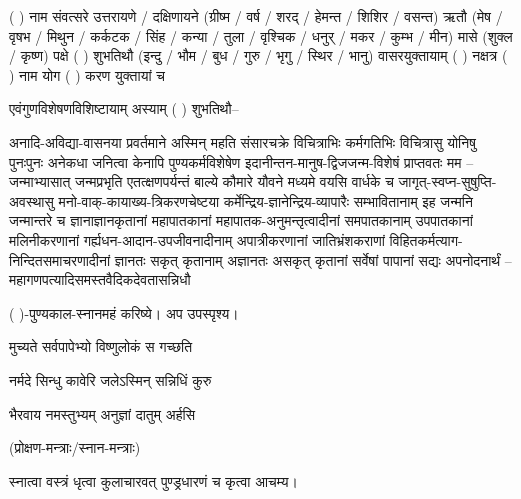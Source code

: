 (   ) नाम संवत्सरे उत्तरायणे / दक्षिणायने 
(ग्रीष्म / वर्ष / शरद् / हेमन्त / शिशिर / वसन्त) ऋतौ  (मेष / वृषभ / मिथुन / कर्कटक / सिंह / कन्या / तुला / 
वृश्चिक / धनुर् / मकर / कुम्भ / मीन) मासे (शुक्ल / कृष्ण) पक्षे ( ) शुभतिथौ
(इन्दु / भौम / बुध / गुरु / भृगु / स्थिर / भानु) वासरयुक्तायाम्
(  ) नक्षत्र (  ) नाम  योग  (  ) करण युक्तायां च 

एवं\-गुण\-विशेषण\-विशिष्टायाम् अस्याम् ( ) शुभतिथौ–

अनादि-अविद्या-वासनया प्रवर्तमाने अस्मिन् महति संसारचक्रे विचित्राभिः कर्मगतिभिः विचित्रासु योनिषु
पुनःपुनः अनेकधा जनित्वा केनापि पुण्यकर्मविशेषेण इदानीन्तन-मानुष-द्विजजन्म-विशेषं प्राप्तवतः मम –\\
जन्माभ्यासात् जन्मप्रभृति एतत्क्षणपर्यन्तं बाल्ये कौमारे यौवने मध्यमे वयसि वार्धके च
जागृत्-स्वप्न-सुषुप्ति-अवस्थासु मनो-वाक्-कायाख्य-त्रिकरणचेष्टया कर्मेन्द्रिय-ज्ञानेन्द्रिय-व्यापारैः
सम्भावितानाम् इह जन्मनि जन्मान्तरे च ज्ञानाज्ञानकृतानां महापातकानां महापातक-अनुमन्तृत्वादी\-नां
समपातकानाम् उपपातकानां मलिनी\-करणानां गर्ह्यधन-आदान-उपजीवनादीनाम् अपात्रीकरणानां जातिभ्रंश\-कराणां
विहित\-कर्म\-त्याग-निन्दित\-समाचरणादीनां ज्ञानतः सकृत् कृतानाम् अज्ञानतः असकृत् कृतानां सर्वेषां पापानां
सद्यः अपनोदनार्थं –\\
महागणपत्यादिसमस्तवैदिकदेवतासन्निधौ

( )-पुण्यकाल-स्नानमहं करिष्ये। अप उपस्पृश्य।

{मुच्यते सर्वपापेभ्यो विष्णुलोकं स गच्छति}%

{नर्मदे सिन्धु कावेरि जलेऽस्मिन् सन्निधिं कुरु}

{भैरवाय नमस्तुभ्यम् अनुज्ञां दातुम् अर्हसि}

\centerline{(प्रोक्षण-मन्त्राः/स्नान-मन्त्राः)} 

स्नात्वा वस्त्रं धृत्वा कुलाचारवत् पुण्ड्रधारणं च कृत्वा आचम्य।

\closesection
